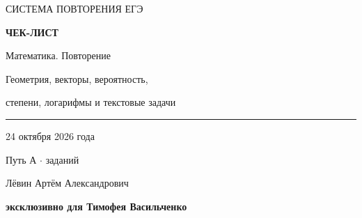 \documentclass[a4paper,12pt]{article}
\begin{document}
\thispagestyle{empty}
\vspace*{31mm}
\begin{center}
{\Large\color{darkaccent} СИСТЕМА ПОВТОРЕНИЯ ЕГЭ}\par
\vspace{22mm}
{\Huge\bfseries ЧЕК-ЛИСТ}\par
\vspace{8mm}
{\LARGE Математика. Повторение}\par
\vspace{5mm}
{\large Геометрия, векторы, вероятность,\par степени, логарифмы и текстовые задачи}\par
\vspace{27mm}
{\color{accent}\rule{0.63\linewidth}{0.8pt}}\par
\vspace{12mm}
{\Large 24 октября 2026 года}\par
\vspace{10mm}
{\large Путь А \quad $\cdot$  заданий}\par
\vspace{25mm}
{\normalsize Лёвин Артём Александрович}\par
{\bfseries эксклюзивно для Тимофея Васильченко}\par
\end{center}
\vfill
\begin{center}
\end{center}
\clearpage
\end{document}
